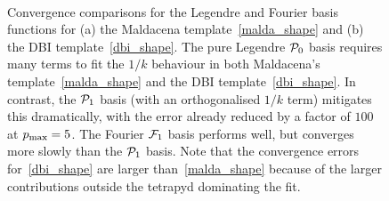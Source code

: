 \begin{figure}[!pth]
\centering     %
\\
\caption{
    Convergence comparisons for the Legendre and Fourier basis functions for (a) the Maldacena 
    template~\eqref{malda_shape} and (b) the DBI template~\eqref{dbi_shape}.
    The pure Legendre $\mathcal{P}_0$ basis requires many terms to fit the $1/k$ behaviour
    in both Maldacena's template~\eqref{malda_shape} and the DBI template~\eqref{dbi_shape}.
    In contrast, the $\mathcal{P}_1$ basis (with an orthogonalised $1/k$ term) mitigates this dramatically, with the 
    error already reduced by a factor of $100$ at $p_\text{max}=5$.
    The Fourier $\mathcal{F}_1$ basis performs well, but converges more slowly than the $\mathcal{P}_1$ basis.
    Note that the convergence errors for~\eqref{dbi_shape} are larger than~\eqref{malda_shape} because of the larger contributions outside the tetrapyd dominating the fit.
}\label{fig:recon_malda_dbi}
\end{figure}


